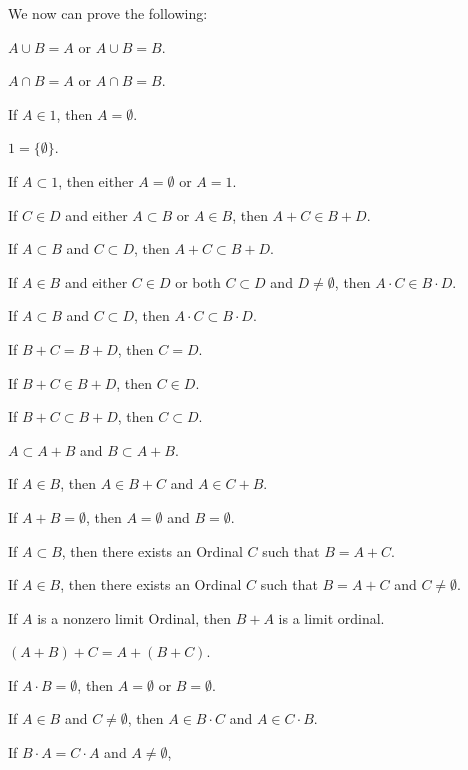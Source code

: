 \documentclass{article}
\begin{document}
We now can prove the following:
\begin{thm}
\item\label{ordinal3:12} $A\cup B=A$ or $A\cup B=B$.
\item\label{ordinal3:13} $A\cap B=A$ or $A\cap B=B$.
\item\label{ordinal3:14} If $A\in 1$, then $A=\emptyset$.
\item\label{ordinal3:15} $1=\{\emptyset\}$.
\item\label{ordinal3:16} If $A\subset1$, then either $A=\emptyset$ or $A=1$.
\item\label{ordinal3:17} If $C\in D$ and either $A\subset B$ or $A\in B$,
  then $A+C\in B+D$.
\item\label{ordinal3:18} If $A\subset B$ and $C\subset D$,
  then $A+C\subset B+D$.
\item\label{ordinal3:19} If $A\in B$ and either $C\in D$ or both $C\subset D$ 
  and $D\neq\emptyset$, then  $A\cdot C\in B\cdot D$.
\item\label{ordinal3:20} If $A\subset B$ and $C\subset D$, then $A\cdot C\subset B\cdot D$.
\item\label{ordinal3:21} If $B+C=B+D$, then $C=D$.
\item\label{ordinal3:22} If $B+C\in B+D$, then $C\in D$.
\item\label{ordinal3:23} If $B+C\subset B+D$, then $C\subset D$.
\item\label{ordinal3:24} $A\subset A+B$ and $B\subset A+B$.
\item\label{ordinal3:25} If $A\in B$, then $A\in B+C$ and $A\in C+B$.
\item\label{ordinal3:26} If $A+B=\emptyset$, then $A=\emptyset$ and $B=\emptyset$.
\item\label{ordinal3:27} If $A\subset B$, then there exists an Ordinal
  $C$ such that $B=A+C$.
\item\label{ordinal3:28} If $A\in B$, then there exists an Ordinal
  $C$ such that $B=A+C$ and $C\neq\emptyset$. 
\item\label{ordinal3:29} If $A$ is a nonzero limit Ordinal, then $B+A$
  is a limit ordinal.
\item\label{ordinal3:30} $(A+B)+C=A+(B+C)$.
\item\label{ordinal3:31} If $A\cdot B=\emptyset$, then $A=\emptyset$ or $B=\emptyset$.
\item\label{ordinal3:32} If $A\in B$ and $C\neq\emptyset$, then $A\in B\cdot C$
  and $A\in C\cdot B$.
\item\label{ordinal3:33} If $B\cdot A=C\cdot A$ and $A\neq\emptyset$,

\end{thm}
\end{document}
